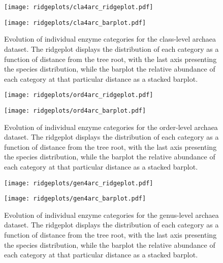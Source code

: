 \begin{figure}[H]
    \centering
    \texttt{[image: ridgeplots/cla4arc\_ridgeplot.pdf]}
    \label{ridgeplot_cla4arc}
\end{figure}

\begin{figure}[H]
    \centering
    \texttt{[image: ridgeplots/cla4arc\_barplot.pdf]}
    \caption[]{Evolution of individual enzyme categories for the class-level archaea dataset. The ridgeplot displays the distribution of each category as a function of distance from the tree root, with the last axis presenting the species distribution, while the barplot the relative abundance of each category at that particular distance as a stacked barplot.}
    \label{barplot_cla4arc}
\end{figure}

\begin{figure}[H]
    \centering
    \texttt{[image: ridgeplots/ord4arc\_ridgeplot.pdf]}
    \label{ridgeplot_ord4arc}
\end{figure}

\begin{figure}[H]
    \centering
    \texttt{[image: ridgeplots/ord4arc\_barplot.pdf]}
    \caption[]{Evolution of individual enzyme categories for the order-level archaea dataset. The ridgeplot displays the distribution of each category as a function of distance from the tree root, with the last axis presenting the species distribution, while the barplot the relative abundance of each category at that particular distance as a stacked barplot.}
    \label{barplot_ord4arc}
\end{figure}

\begin{figure}[H]
    \centering
    \texttt{[image: ridgeplots/gen4arc\_ridgeplot.pdf]}
    \label{ridgeplot_gen4arc}
\end{figure}

\begin{figure}[H]
    \centering
    \texttt{[image: ridgeplots/gen4arc\_barplot.pdf]}
    \caption[]{Evolution of individual enzyme categories for the genus-level archaea dataset. The ridgeplot displays the distribution of each category as a function of distance from the tree root, with the last axis presenting the species distribution, while the barplot the relative abundance of each category at that particular distance as a stacked barplot.}
    \label{barplot_gen4arc}
\end{figure}


